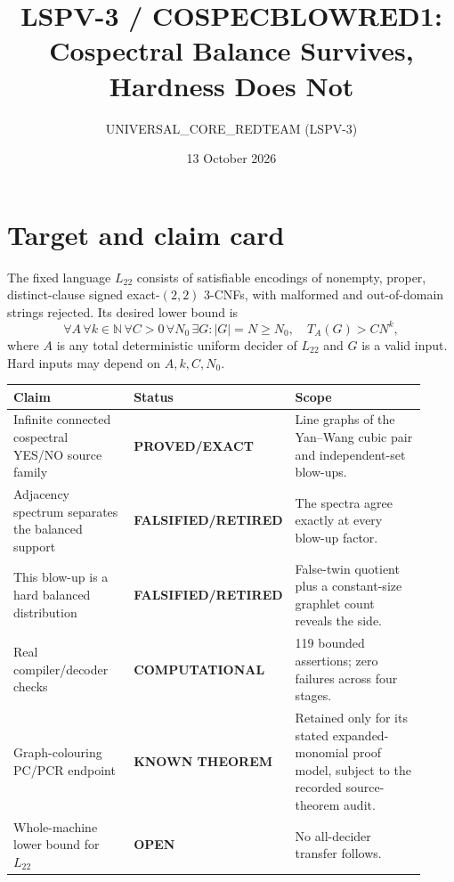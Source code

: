 \documentclass[11pt]{article}
\title{LSPV-3 / COSPECBLOWRED1:\\Cospectral Balance Survives, Hardness Does Not}
\author{UNIVERSAL\_CORE\_REDTEAM (LSPV-3)}
\date{13 October 2026}
\newcommand{\Ltw}{L_{22}}
\newcommand{\st}[1]{\textbf{#1}}
\begin{document}
\maketitle

\begin{center}
\end{center}

\section{Target and claim card}
The fixed language $\Ltw$ consists of satisfiable encodings of nonempty, proper,
distinct-clause signed exact-$(2,2)$ 3-CNFs, with malformed and out-of-domain strings
rejected.  Its desired lower bound is
\[
\forall A\,\forall k\in\mathbb N\,\forall C>0\,\forall N_0\,\exists G:
|G|=N\ge N_0,\quad T_A(G)>CN^k,
\]
where $A$ is any total deterministic uniform decider of $\Ltw$ and $G$ is a valid
input.  Hard inputs may depend on $A,k,C,N_0$.

\begin{longtable}{p{0.32\linewidth}p{0.18\linewidth}p{0.42\linewidth}}
\toprule Claim & Status & Scope \\
\midrule
Infinite connected cospectral YES/NO source family & \st{PROVED/EXACT} &
Line graphs of the Yan--Wang cubic pair and independent-set blow-ups.\\
Adjacency spectrum separates the balanced support & \st{FALSIFIED/RETIRED} &
The spectra agree exactly at every blow-up factor.\\
This blow-up is a hard balanced distribution & \st{FALSIFIED/RETIRED} &
False-twin quotient plus a constant-size graphlet count reveals the side.\\
Real compiler/decoder checks & \st{COMPUTATIONAL} & 119 bounded assertions; zero
failures across four stages.\\
Graph-colouring PC/PCR endpoint & \st{KNOWN THEOREM} & Retained only for its stated
expanded-monomial proof model, subject to the recorded source-theorem audit.\\
Whole-machine lower bound for $\Ltw$ & \st{OPEN} & No all-decider transfer follows.\\
\bottomrule
\end{longtable}
\end{document}

